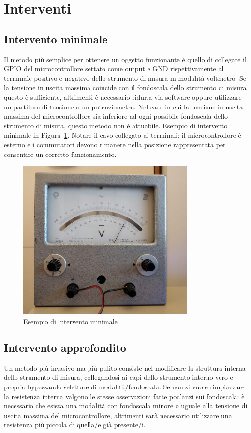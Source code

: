 \documentclass[12pt,a4paper]{report}
\begin{document}
\section{Interventi}
\subsection{Intervento minimale}
Il metodo più semplice per ottenere un oggetto funzionante è quello di collegare il GPIO del microcontrollore settato come output
e GND rispettivamente al terminale positivo e negativo dello strumento di misura in modalità voltmetro. Se la tensione in uscita massima
coincide con il fondoscala dello strumento di misura questo è sufficiente, altrimenti è necessario ridurla via software oppure
utilizzare un partitore di tensione o un potenziometro. Nel caso in cui la tensione in uscita massima del microcontrollore sia inferiore
ad ogni possibile fondoscala dello strumento di misura, questo metodo non è attuabile. Esempio di intervento minimale in
Figura~\ref{fig:interventominimale}. Notare il cavo collegato ai terminali: il microcontrollore è esterno
e i commutatori devono rimanere nella posizione rappresentata per consentire un corretto funzionamento.

\begin{figure}[h]
  \centering
  \includegraphics[width=0.8\textwidth]{interventominimale}
  \caption{Esempio di intervento minimale}
  \label{fig:interventominimale}
\end{figure}

\subsection{Intervento approfondito}
Un metodo più invasivo ma più pulito consiste nel modificare la struttura interna dello strumento di misura, collegandosi ai capi dello
strumento interno vero e proprio bypassando selettore di modalità/fondoscala.
Se non si vuole rimpiazzare la resistenza interna valgono le stesse osservazioni fatte poc'anzi sui fondoscala: è necessario che
esista una modalità con fondoscala minore o uguale alla tensione di uscita massima del microcontrollore, altrimenti sarà necessario
utilizzare una resistenza più piccola di quella/e già presente/i. 
\end{document}
